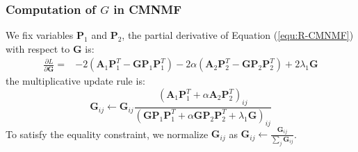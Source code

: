 \documentclass{bmcart}
\begin{document}
\subsubsection*{\textbf{Computation of $G$ in CMNMF}}
We fix variables $\bm{P}_1$ and $\bm{P}_2$,
the partial derivative of Equation (\ref{equ:R-CMNMF}) with respect to $\bm{G}$ is:
\begin{equation}\label{equ:G_gradient}\nonumber
\begin{split}
\frac{\partial{L}}{\partial{\bm{G}}}=
&-2(\bm{A}_1{\bm{P}_1^T} - \bm{G}{\bm{P}_1}{\bm{P}_1^T})-2\alpha(\bm{A}_2{\bm{P}_2^T} - \bm{G}{\bm{P}_2}{\bm{P}_2^T})+2\lambda_1\bm{G}
\end{split}
\end{equation}
the multiplicative update rule is:
\begin{equation}\label{equ:updating_G}\nonumber
\bm{G}_{ij}\leftarrow \bm{G}_{ij}
\frac{(\bm{A}_1\bm{P}_1^T+\alpha \bm{A}_2\bm{P}_2^T)_{ij}}
{(\bm{GP}_1\bm{P}_1^T+\alpha \bm{GP}_2\bm{P}_2^T+\lambda_1\bm{G})_{ij}}
\end{equation}
To satisfy the equality constraint, we normalize $\bm{G}_{ij}$ as $\bm{G}_{ij}\leftarrow\frac{\bm{G}_{ij}}{\sum_{j}\bm{G}_{ij}}$.

\end{document}
